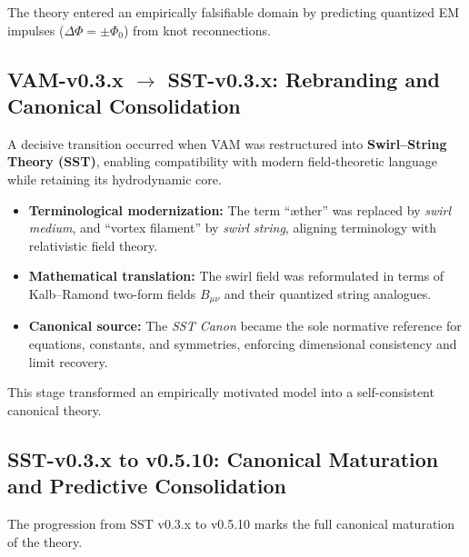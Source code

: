 \documentclass[10pt,reprint,aps,onecolumn,nofootinbib]{revtex4-2}
\begin{document}
        The theory entered an empirically falsifiable domain by predicting quantized EM impulses ($\Delta\Phi=\pm\Phi_0$) from knot reconnections.

    \subsection{VAM-v0.3.x $\rightarrow$ SST-v0.3.x: Rebranding and Canonical Consolidation}

        A decisive transition occurred when VAM was restructured into \textbf{Swirl--String Theory (SST)}, enabling compatibility with modern field-theoretic language while retaining its hydrodynamic core.

        \begin{itemize}
            \item \textbf{Terminological modernization:} The term ``æther'' was replaced by \emph{swirl medium}, and ``vortex filament'' by \emph{swirl string}, aligning terminology with relativistic field theory.
            \item \textbf{Mathematical translation:} The swirl field was reformulated in terms of Kalb--Ramond two-form fields $B_{\mu\nu}$ and their quantized string analogues.
            \item \textbf{Canonical source:} The \emph{SST Canon} became the sole normative reference for equations, constants, and symmetries, enforcing dimensional consistency and limit recovery.
        \end{itemize}

        This stage transformed an empirically motivated model into a self-consistent canonical theory.

    \subsection{SST-v0.3.x to v0.5.10: Canonical Maturation and Predictive Consolidation}

        The progression from SST v0.3.x to v0.5.10 marks the full canonical maturation of the theory.
\end{document}
